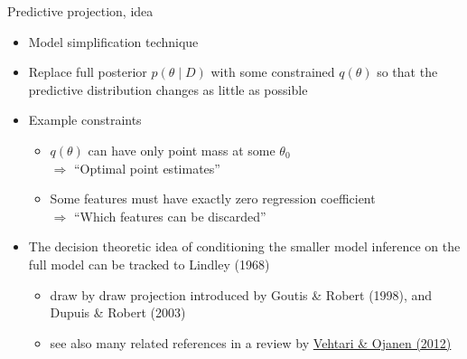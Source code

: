 \documentclass[english,t]{beamer}
\renewcommand{\emph}[1]{\textcolor{navyblue}{#1}}
\begin{document}
\begin{frame}{}

  {\Large\color{navyblue} Predictive projection, idea}
  
  \begin{itemize}
  \item Model simplification technique
  \item<2-> Replace full posterior $p(\theta \mid D)$ with
    some constrained $q(\theta)$ so that the \emph{predictive
      distribution} changes as little as possible
  \item<3-> Example constraints
    \begin{itemize}
    \item $q(\theta)$ can have only point mass at some $\theta_0$ \\
      $\Rightarrow$ ``Optimal point estimates''
    \item<4-> Some features must have exactly zero regression coefficient \\
      $\Rightarrow$ ``Which features can be discarded''
    \end{itemize}
    \vspace{1\baselineskip}
  \item<5-> The decision theoretic idea of conditioning the smaller
    model inference on the full model can be tracked to Lindley (1968)
    \begin{itemize}
    \item draw by draw projection introduced by Goutis \& Robert
      (1998), and Dupuis \& Robert (2003)
    \item see also many related references in a review by
      \href{http://dx.doi.org/10.1214/12-SS102}{Vehtari \& Ojanen
        (2012)}
    \end{itemize}
\end{itemize}

\end{frame}
\end{document}
